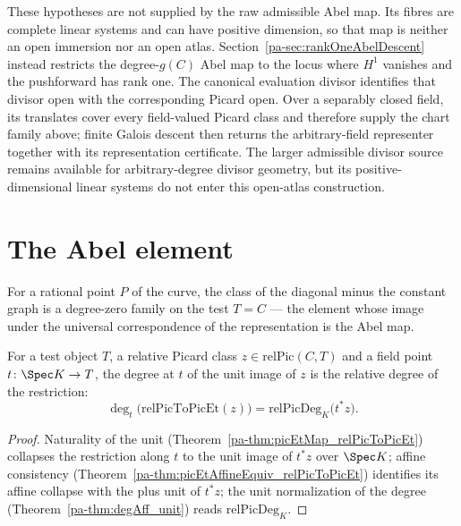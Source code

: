 These hypotheses are not supplied by the raw admissible Abel map.  Its fibres are complete
linear systems and can have positive dimension, so that map is neither an open immersion nor
an open atlas.  Section~\ref{pa-sec:rankOneAbelDescent} instead restricts the degree-\(g(C)\) Abel
map to the locus where \(H^1\) vanishes and the pushforward has rank one.  The canonical
evaluation divisor identifies that divisor open with the corresponding Picard open.  Over a
separably closed field, its translates cover every field-valued Picard class and therefore
supply the chart family above; finite Galois descent then returns the arbitrary-field
representer together with its representation certificate.  The larger admissible divisor
source remains available for arbitrary-degree divisor geometry, but its positive-dimensional
linear systems do not enter this open-atlas construction.

\section{The Abel element}
\label{pa-sec:abelElement}

For a rational point \(P\) of the curve, the class of the diagonal minus the constant graph
is a degree-zero family on the test \(T = C\) — the element whose image under the universal
correspondence of the representation is the Abel map.

\begin{theorem}
  \label{pa-thm:degAt_relPicToPicEt}
  \leanok

  For a test object \(T\), a relative Picard class \(z \in \mathrm{relPic}(C,T)\) and a
  field point \(t \colon \Spec K \to T\), the degree at \(t\) of the unit image of \(z\) is
  the relative degree of the restriction:
  \[
    \deg_t\bigl(\mathrm{relPicToPicEt}(z)\bigr) = \mathrm{relPicDeg}_K\bigl(t^{*} z\bigr).
  \]
\end{theorem}
\begin{proof}
  \leanok
  Naturality of the unit (Theorem~\ref{pa-thm:picEtMap_relPicToPicEt}) collapses the
  restriction along \(t\) to the unit image of \(t^{*}z\) over \(\Spec K\); affine
  consistency (Theorem~\ref{pa-thm:picEtAffineEquiv_relPicToPicEt}) identifies its affine
  collapse with the plus unit of \(t^{*}z\); the unit normalization of the degree
  (Theorem~\ref{pa-thm:degAff_unit}) reads \(\mathrm{relPicDeg}_K\).
\end{proof}

